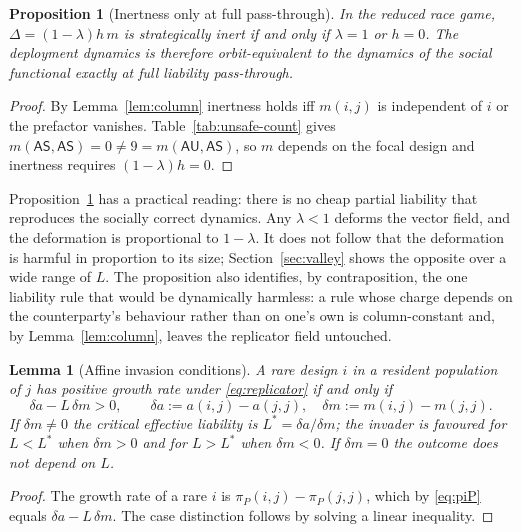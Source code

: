 \documentclass[pdflatex]{sn-jnl}
\theoremstyle{thmstyleone}
\newtheorem{proposition}[theorem]{Proposition}
\newtheorem{lemma}[theorem]{Lemma}
\theoremstyle{thmstylethree}
\theoremstyle{thmstyletwo}
\newcommand{\AS}{\textsf{AS}}
\newcommand{\AU}{\textsf{AU}}
\newcommand{\piP}{\pi_{P}}
\begin{document}
\begin{proposition}[Inertness only at full pass-through]\label{prop:inert}
In the reduced race game, $\Delta=(1-\lambda)h\,m$ is strategically inert if
and only if $\lambda=1$ or $h=0$. The deployment dynamics is therefore
orbit-equivalent to the dynamics of the social functional exactly at full
liability pass-through.
\end{proposition}

\begin{proof}
By Lemma~\ref{lem:column} inertness holds iff $m(i,j)$ is independent of $i$
or the prefactor vanishes. Table~\ref{tab:unsafe-count} gives
$m(\AS,\AS)=0\neq 9=m(\AU,\AS)$, so $m$ depends on the focal design and
inertness requires $(1-\lambda)h=0$.
\end{proof}

Proposition~\ref{prop:inert} has a practical reading: there is no cheap
partial liability that reproduces the socially correct dynamics. Any
$\lambda<1$ deforms the vector field, and the deformation is proportional to
$1-\lambda$. It does not follow that the deformation is harmful in proportion
to its size; Section~\ref{sec:valley} shows the opposite over a wide range of
$L$. The proposition also identifies, by contraposition, the one liability
rule that would be dynamically harmless: a rule whose charge depends on the
counterparty's behaviour rather than on one's own is column-constant and,
by Lemma~\ref{lem:column}, leaves the replicator field untouched.

\begin{lemma}[Affine invasion conditions]\label{lem:affine}
A rare design $i$ in a resident population of $j$ has positive growth rate
under \eqref{eq:replicator} if and only if
\begin{equation}
\delta a - L\,\delta m > 0,
\qquad
\delta a := a(i,j)-a(j,j),
\quad
\delta m := m(i,j)-m(j,j).
\label{eq:invasion}
\end{equation}
If $\delta m\neq 0$ the critical effective liability is
$L^{*}=\delta a/\delta m$; the invader is favoured for $L<L^{*}$ when
$\delta m>0$ and for $L>L^{*}$ when $\delta m<0$. If $\delta m=0$ the outcome
does not depend on $L$.
\end{lemma}

\begin{proof}
The growth rate of a rare $i$ is $\piP(i,j)-\piP(j,j)$, which by
\eqref{eq:piP} equals $\delta a-L\,\delta m$. The case distinction follows by
solving a linear inequality.
\end{proof}
\end{document}
